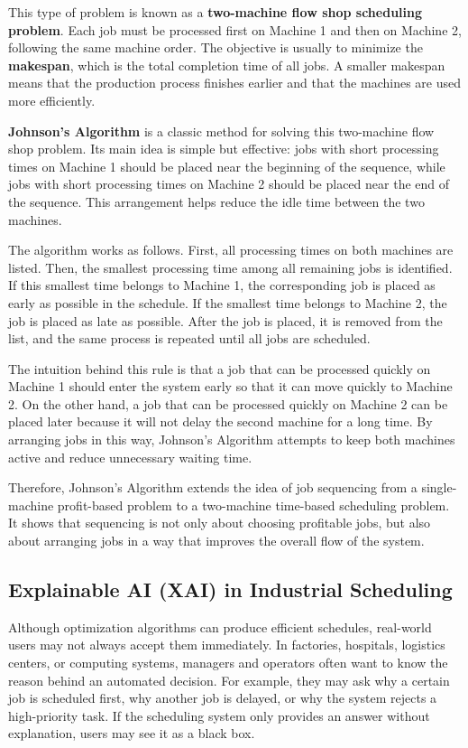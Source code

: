 \documentclass[11pt,a4paper]{article}
\begin{document}
This type of problem is known as a \textbf{two-machine flow shop scheduling problem}. Each job must be processed first on Machine 1 and then on Machine 2, following the same machine order. The objective is usually to minimize the \textbf{makespan}, which is the total completion time of all jobs. A smaller makespan means that the production process finishes earlier and that the machines are used more efficiently.

\textbf{Johnson's Algorithm} is a classic method for solving this two-machine flow shop problem. Its main idea is simple but effective: jobs with short processing times on Machine 1 should be placed near the beginning of the sequence, while jobs with short processing times on Machine 2 should be placed near the end of the sequence. This arrangement helps reduce the idle time between the two machines.

The algorithm works as follows. First, all processing times on both machines are listed. Then, the smallest processing time among all remaining jobs is identified. If this smallest time belongs to Machine 1, the corresponding job is placed as early as possible in the schedule. If the smallest time belongs to Machine 2, the job is placed as late as possible. After the job is placed, it is removed from the list, and the same process is repeated until all jobs are scheduled.

The intuition behind this rule is that a job that can be processed quickly on Machine 1 should enter the system early so that it can move quickly to Machine 2. On the other hand, a job that can be processed quickly on Machine 2 can be placed later because it will not delay the second machine for a long time. By arranging jobs in this way, Johnson's Algorithm attempts to keep both machines active and reduce unnecessary waiting time.

Therefore, Johnson's Algorithm extends the idea of job sequencing from a single-machine profit-based problem to a two-machine time-based scheduling problem. It shows that sequencing is not only about choosing profitable jobs, but also about arranging jobs in a way that improves the overall flow of the system.

\subsection{Explainable AI (XAI) in Industrial Scheduling}

Although optimization algorithms can produce efficient schedules, real-world users may not always accept them immediately. In factories, hospitals, logistics centers, or computing systems, managers and operators often want to know the reason behind an automated decision. For example, they may ask why a certain job is scheduled first, why another job is delayed, or why the system rejects a high-priority task. If the scheduling system only provides an answer without explanation, users may see it as a black box.
\end{document}
